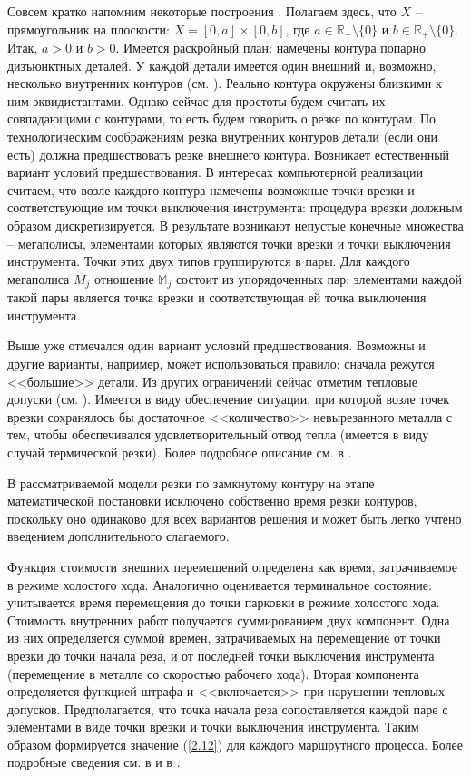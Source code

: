 \documentclass[10pt]{SPIIRAS_Proceedings}
\begin{document}
Совсем кратко напомним некоторые построения \cite[$\S$ 3.3]{4}.
Полагаем здесь, что $X$ -- прямоугольник на плоскости:
$X = [0,a] \times [0,b]$,
где $a \in \mathbb{R}_+ \setminus \{0\}$ и $b \in \mathbb{R}_+ \setminus \{0\}.$
Итак, $a > 0$ и $b > 0.$
Имеется раскройный план;
намечены контура попарно дизъюнктных деталей.
У каждой детали имеется один внешний и,
возможно,
несколько внутренних контуров
(см. \cite[\S~3.2]{4}).
Реально контура окружены близкими к ним эквидистантами.
Однако сейчас для простоты
будем считать их совпадающими с контурами,
то есть будем говорить о резке по контурам.
По технологическим соображениям
резка внутренних контуров детали
(если они есть)
должна предшествовать резке внешнего контура.
Возникает естественный вариант условий предшествования.
В интересах компьютерной реализации считаем,
что возле каждого контура намечены возможные
точки врезки и соответствующие им точки выключения инструмента:
процедура врезки должным образом дискретизируется.
В результате возникают непустые конечные множества --
мегаполисы,
элементами которых являются точки врезки
и точки выключения инструмента.
Точки этих двух типов группируются в пары.
Для каждого мегаполиса
$M_j$
отношение
$\mathbb{M}_j$
состоит из упорядоченных пар;
элементами каждой такой пары является
точка врезки
и соответствующая ей точка выключения инструмента.

Выше уже отмечался один вариант
условий предшествования.
Возможны и другие варианты,
например,
может использоваться правило:
сначала режутся <<большие>> детали.
Из других ограничений сейчас отметим
тепловые допуски
(см. \cite{18}).
Имеется в виду обеспечение ситуации,
при которой возле точек врезки сохранялось бы
достаточное <<количество>>
невырезанного металла с тем,
чтобы обеспечивался удовлетворительный отвод тепла
(имеется в виду случай термической резки).
Более подробное описание см. в \cite{18}.

В рассматриваемой модели резки
по замкнутому контуру
на этапе математической постановки исключено
собственно время резки контуров,
поскольку оно одинаково для всех вариантов решения
и может быть легко учтено введением
дополнительного слагаемого.

Функция стоимости внешних перемещений
определена как время,
затрачиваемое в режиме холостого хода.
Аналогично оценивается терминальное состояние:
учитывается время перемещения до точки парковки
в режиме холостого хода.
Стоимость внутренних работ
получается суммированием двух компонент.
Одна из них определяется суммой времен,
затрачиваемых на перемещение
от точки врезки до точки начала реза,
и от последней точки выключения инструмента
(перемещение в металле со скоростью рабочего хода).
Вторая компонента определяется функцией штрафа и
<<включается>> при нарушении тепловых допусков.
Предполагается, что точка начала реза
сопоставляется каждой паре с элементами в виде
точки врезки и точки выключения инструмента.
Таким образом
формируется значение (\ref{2.12})
для каждого маршрутного процесса.
Более подробные сведения см. в
\cite[часть 1, глава 3]{4}
и в
\cite{18}.
\end{document}
